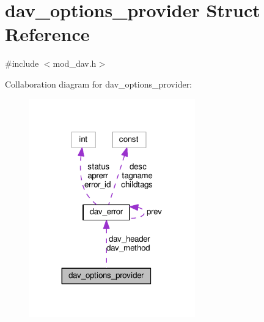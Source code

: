 \hypertarget{structdav__options__provider}{}\section{dav\+\_\+options\+\_\+provider Struct Reference}
\label{structdav__options__provider}


{\ttfamily \#include $<$mod\+\_\+dav.\+h$>$}



Collaboration diagram for dav\+\_\+options\+\_\+provider\+:
\nopagebreak
\begin{figure}[H]
\begin{center}
\leavevmode
\includegraphics[width=203pt]{structdav__options__provider__coll__graph}
\end{center}
\end{figure}
